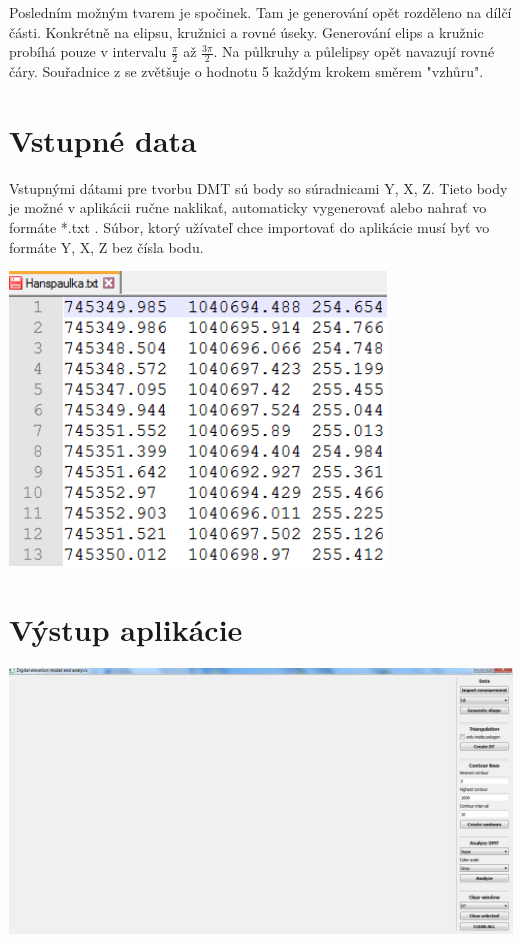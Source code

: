 \documentclass[12pt]{article}
\begin{document}
Posledním možným tvarem je spočinek. Tam je generování opět rozděleno na dílčí části. Konkrétně na elipsu, kružnici a rovné úseky. Generování elips a kružnic probíhá pouze v intervalu $\frac{\pi}{2}$ až $\frac{3\pi}{2}$. Na půlkruhy a půlelipsy opět navazují rovné čáry. Souřadnice z se zvětšuje o hodnotu 5 každým krokem směrem "vzhůru".

\clearpage 
\section{Vstupné data}
Vstupnými dátami pre tvorbu DMT sú body so súradnicami Y, X, Z. Tieto body je možné v aplikácii ručne naklikať, automaticky vygenerovať alebo nahrať vo formáte *.txt . Súbor, ktorý užívateľ chce importovať do aplikácie musí byť vo formáte Y, X, Z bez čísla bodu.


\begin{center}
   \includegraphics[width=10cm]{./img/vstupny_format.png}
\end{center}


\clearpage 
\section{Výstup aplikácie}
\begin{center}
   \includegraphics[width=14cm]{./img/ukazka_aplikacie.png}
\end{center}
\end{document}
